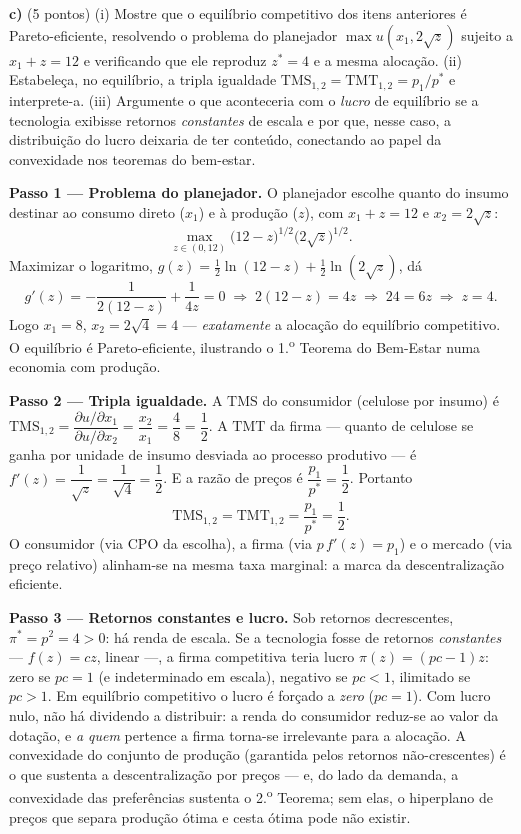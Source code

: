 \textbf{c)} (5 pontos) (i) Mostre que o equilíbrio competitivo dos itens anteriores é Pareto-eficiente, resolvendo o problema do planejador $\max u(x_1,2\sqrt{z})$ sujeito a $x_1+z=12$ e verificando que ele reproduz $z^{*}=4$ e a mesma alocação. (ii) Estabeleça, no equilíbrio, a tripla igualdade $\text{TMS}^{}_{1,2}=\text{TMT}^{}_{1,2}=p_1/p^{*}$ e interprete-a. (iii) Argumente o que aconteceria com o \emph{lucro} de equilíbrio se a tecnologia exibisse retornos \emph{constantes} de escala e por que, nesse caso, a distribuição do lucro deixaria de ter conteúdo, conectando ao papel da convexidade nos teoremas do bem-estar.
\resolucaobox{7.2cm}
\begin{solucao}
\textbf{Passo 1 --- Problema do planejador.} O planejador escolhe quanto do insumo destinar ao consumo direto ($x_1$) e à produção ($z$), com $x_1+z=12$ e $x_2=2\sqrt{z}$:
\[ \max_{z\in(0,12)} \big(12-z\big)^{1/2}\big(2\sqrt{z}\big)^{1/2}. \]
Maximizar o logaritmo, $g(z)=\tfrac12\ln(12-z)+\tfrac12\ln(2\sqrt z)$, dá
\[ g'(z)=-\frac{1}{2(12-z)}+\frac{1}{4z}=0 \;\Longrightarrow\; 2(12-z)=4z \;\Longrightarrow\; 24=6z \;\Longrightarrow\; z=4. \]
Logo $x_1=8$, $x_2=2\sqrt 4=4$ --- \emph{exatamente} a alocação do equilíbrio competitivo. O equilíbrio é Pareto-eficiente, ilustrando o 1.\textsuperscript{o} Teorema do Bem-Estar numa economia com produção.

\textbf{Passo 2 --- Tripla igualdade.} A $\text{TMS}$ do consumidor (celulose por insumo) é $\text{TMS}_{1,2}=\dfrac{\partial u/\partial x_1}{\partial u/\partial x_2}=\dfrac{x_2}{x_1}=\dfrac{4}{8}=\dfrac12$. A $\text{TMT}$ da firma --- quanto de celulose se ganha por unidade de insumo desviada ao processo produtivo --- é $f'(z)=\dfrac{1}{\sqrt z}=\dfrac{1}{\sqrt 4}=\dfrac12$. E a razão de preços é $\dfrac{p_1}{p^{*}}=\dfrac{1}{2}$. Portanto
\[ \text{TMS}_{1,2}=\text{TMT}_{1,2}=\frac{p_1}{p^{*}}=\frac12. \]
O consumidor (via CPO da escolha), a firma (via $p\,f'(z)=p_1$) e o mercado (via preço relativo) alinham-se na mesma taxa marginal: a marca da descentralização eficiente.

\textbf{Passo 3 --- Retornos constantes e lucro.} Sob retornos decrescentes, $\pi^{*}=p^{2}=4>0$: há renda de escala. Se a tecnologia fosse de retornos \emph{constantes} --- $f(z)=cz$, linear ---, a firma competitiva teria lucro $\pi(z)=(pc-1)z$: zero se $pc=1$ (e indeterminado em escala), negativo se $pc<1$, ilimitado se $pc>1$. Em equilíbrio competitivo o lucro é forçado a \emph{zero} ($pc=1$). Com lucro nulo, não há dividendo a distribuir: a renda do consumidor reduz-se ao valor da dotação, e \emph{a quem} pertence a firma torna-se irrelevante para a alocação. A convexidade do conjunto de produção (garantida pelos retornos não-crescentes) é o que sustenta a descentralização por preços --- e, do lado da demanda, a convexidade das preferências sustenta o 2.\textsuperscript{o} Teorema; sem elas, o hiperplano de preços que separa produção ótima e cesta ótima pode não existir.


\end{solucao}
